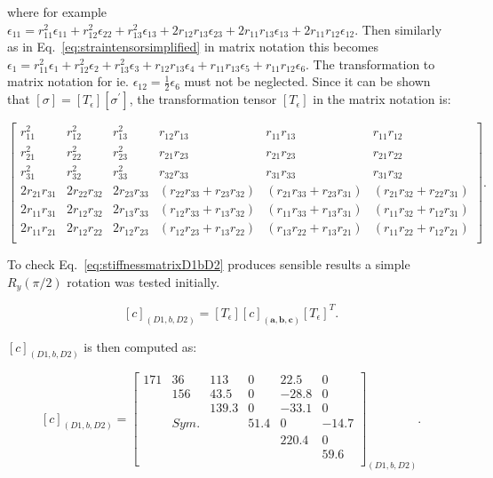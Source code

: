 where for example $\epsilon_{11} = r_{11}^{2}\epsilon_{11} + r_{12}^{2}\epsilon_{22} + r_{13}^{2}\epsilon_{13} +2r_{12}r_{13}\epsilon_{23} + 2r_{11}r_{13}\epsilon_{13} + 2r_{11}r_{12}\epsilon_{12}$. Then similarly as in Eq.~\ref{eq:straintensorsimplified} in matrix notation this becomes $\epsilon_{1}=r_{11}^{2}\epsilon_{1} + r_{12}^{2}\epsilon_{2} + r_{13}^{2}\epsilon_{3} + r_{12}r_{13}\epsilon_{4} + r_{11}r_{13}\epsilon_{5} + r_{11}r_{12}\epsilon_{6}$. The transformation to matrix notation for ie. $\epsilon_{12}=\frac{1}{2}\epsilon_{6}$ must not be neglected. Since it can be shown that $[\sigma]=[T_{\epsilon}][\sigma^{'}]$, the transformation tensor $[T_{\epsilon}]$ in the matrix notation is: 

\begin{equation}
\label{eq:transformationmatrix}
\begin{bmatrix}
r_{11}^{2} & r_{12}^{2} & r_{13}^{2} & r_{12}r_{13} & r_{11}r_{13} & r_{11}r_{12} \\
r_{21}^{2} & r_{22}^{2} & r_{23}^{2} & r_{21}r_{23} & r_{21}r_{23} & r_{21}r_{22} \\
r_{31}^{2} & r_{32}^{2} & r_{33}^{2} & r_{32}r_{33} & r_{31}r_{33} & r_{31}r_{32} \\
2r_{21}r_{31} & 2r_{22}r_{32} & 2r_{23}r_{33} & (r_{22}r_{33}+r_{23}r_{32}) & (r_{21}r_{33}+r_{23}r_{31}) & (r_{21}r_{32}+r_{22}r_{31}) \\
2r_{11}r_{31} & 2r_{12}r_{32} & 2r_{13}r_{33} & (r_{12}r_{33}+r_{13}r_{32}) & (r_{11}r_{33}+r_{13}r_{31}) & (r_{11}r_{32}+r_{12}r_{31}) \\
2r_{11}r_{21} & 2r_{12}r_{22} & 2r_{12}r_{23} & (r_{12}r_{23}+r_{13}r_{22}) & (r_{13}r_{22}+r_{13}r_{21}) & (r_{11}r_{22}+r_{12}r_{21}) \\
\end{bmatrix}.
\end{equation}


To check Eq.~\ref{eq:stiffnessmatrixD1bD2} produces sensible results a simple $R_{y}(\pi/2)$ rotation was tested initially.

\begin{equation}
\label{eq:stiffnessmatrixD1bD2}
[c]_{(D1,b,D2)}=[T_{\epsilon}][c]_{(\textbf{a},\textbf{b},\textbf{c})}[T_{\epsilon}]^{T}.
\end{equation}

$[c]_{(D1,b,D2)}$ is then computed as: 

\begin{equation}
\label{eq:stiffnessmatrixC}
[c]_{(D1,b,D2)}=\begin{bmatrix}
171 & 36 & 113 & 0 & 22.5 & 0 \\
& 156 & 43.5 & 0 & -28.8 & 0 \\
& & 139.3 & 0 & -33.1 & 0 \\
& Sym. & & 51.4 & 0 & -14.7 \\
& & & & 220.4 & 0 \\
& & & & & 59.6 \\
\end{bmatrix}_{(D1,b,D2)}.
\end{equation}


